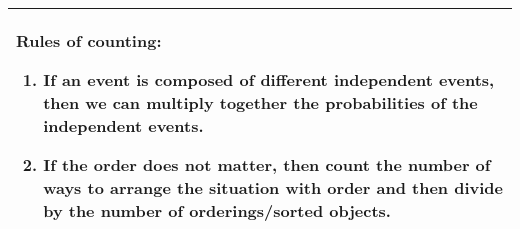{\tabulinesep=1mm
\begin{tabu}{|p{16cm} |}
\hline
\textbf{Rules of counting:}
\begin{enumerate}
\item
If an event is composed of different independent events, then we can multiply together the probabilities of the independent events. 
\item
If the order does not matter, then count the number of ways to arrange the situation with order and then divide by the number of orderings/sorted objects.
\end{enumerate} \\
\hline
\end{tabu}
}